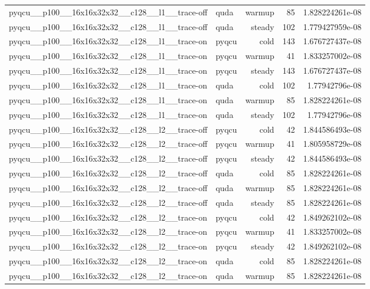 \begin{table}[htbp]
\begin{tabular}{@{}llrrr@{}}
pyqcu\_\_p100\_\_16x16x32x32\_\_c128\_\_l1\_\_trace-off & quda & warmup & 85 & 1.828224261e-08 \\
pyqcu\_\_p100\_\_16x16x32x32\_\_c128\_\_l1\_\_trace-off & quda & steady & 102 & 1.779427959e-08 \\
pyqcu\_\_p100\_\_16x16x32x32\_\_c128\_\_l1\_\_trace-on & pyqcu & cold & 143 & 1.676727437e-08 \\
pyqcu\_\_p100\_\_16x16x32x32\_\_c128\_\_l1\_\_trace-on & pyqcu & warmup & 41 & 1.833257002e-08 \\
pyqcu\_\_p100\_\_16x16x32x32\_\_c128\_\_l1\_\_trace-on & pyqcu & steady & 143 & 1.676727437e-08 \\
pyqcu\_\_p100\_\_16x16x32x32\_\_c128\_\_l1\_\_trace-on & quda & cold & 102 & 1.77942796e-08 \\
pyqcu\_\_p100\_\_16x16x32x32\_\_c128\_\_l1\_\_trace-on & quda & warmup & 85 & 1.828224261e-08 \\
pyqcu\_\_p100\_\_16x16x32x32\_\_c128\_\_l1\_\_trace-on & quda & steady & 102 & 1.77942796e-08 \\
pyqcu\_\_p100\_\_16x16x32x32\_\_c128\_\_l2\_\_trace-off & pyqcu & cold & 42 & 1.844586493e-08 \\
pyqcu\_\_p100\_\_16x16x32x32\_\_c128\_\_l2\_\_trace-off & pyqcu & warmup & 41 & 1.805958729e-08 \\
pyqcu\_\_p100\_\_16x16x32x32\_\_c128\_\_l2\_\_trace-off & pyqcu & steady & 42 & 1.844586493e-08 \\
pyqcu\_\_p100\_\_16x16x32x32\_\_c128\_\_l2\_\_trace-off & quda & cold & 85 & 1.828224261e-08 \\
pyqcu\_\_p100\_\_16x16x32x32\_\_c128\_\_l2\_\_trace-off & quda & warmup & 85 & 1.828224261e-08 \\
pyqcu\_\_p100\_\_16x16x32x32\_\_c128\_\_l2\_\_trace-off & quda & steady & 85 & 1.828224261e-08 \\
pyqcu\_\_p100\_\_16x16x32x32\_\_c128\_\_l2\_\_trace-on & pyqcu & cold & 42 & 1.849262102e-08 \\
pyqcu\_\_p100\_\_16x16x32x32\_\_c128\_\_l2\_\_trace-on & pyqcu & warmup & 41 & 1.833257002e-08 \\
pyqcu\_\_p100\_\_16x16x32x32\_\_c128\_\_l2\_\_trace-on & pyqcu & steady & 42 & 1.849262102e-08 \\
pyqcu\_\_p100\_\_16x16x32x32\_\_c128\_\_l2\_\_trace-on & quda & cold & 85 & 1.828224261e-08 \\
pyqcu\_\_p100\_\_16x16x32x32\_\_c128\_\_l2\_\_trace-on & quda & warmup & 85 & 1.828224261e-08 \\

\end{tabular}
\end{table}
